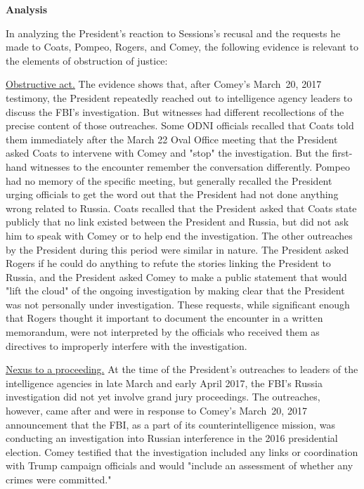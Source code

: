\begin{center}
\textbf{Analysis}
\end{center}

In analyzing the President's reaction to Sessions's recusal and the requests he made to Coats, Pompeo, Rogers, and Comey, the following evidence is relevant to the elements of obstruction of justice:

\underline{Obstructive act.}
The evidence shows that, after Comey's March~20, 2017 testimony, the President repeatedly reached out to intelligence agency leaders to discuss the FBI's investigation.
But witnesses had different recollections of the precise content of those outreaches.
Some ODNI officials recalled that Coats told them immediately after the March 22 Oval Office meeting that the President asked Coats to intervene with Comey and "stop" the investigation.
But the first-hand witnesses to the encounter remember the conversation differently.
Pompeo had no memory of the specific meeting, but generally recalled the President urging officials to get the word out that the President had not done anything wrong related to Russia.
Coats recalled that the President asked that Coats state publicly that no link existed between the President and Russia, but did not ask him to speak with Comey or to help end the investigation.
The other outreaches by the President during this period were similar in nature.
The President asked Rogers if he could do anything to refute the stories linking the President to Russia, and the President asked Comey to make a public statement that would "lift the cloud" of the ongoing investigation by making clear that the President was not personally under investigation.
These requests, while significant enough that Rogers thought it important to document the encounter in a written memorandum, were not
interpreted by the officials who received them as directives to improperly interfere with the investigation.

\underline{Nexus to a proceeding.}
At the time of the President's outreaches to leaders of the intelligence agencies in late March and early April 2017, the FBI's Russia investigation did not yet involve grand jury proceedings.
The outreaches, however, came after and were in response to Comey's March~20, 2017 announcement that the FBI, as a part of its counterintelligence mission, was conducting an investigation into Russian interference in the 2016 presidential election.
Comey testified that the investigation included any links or coordination with Trump campaign officials and would "include an assessment of whether any crimes were committed."


